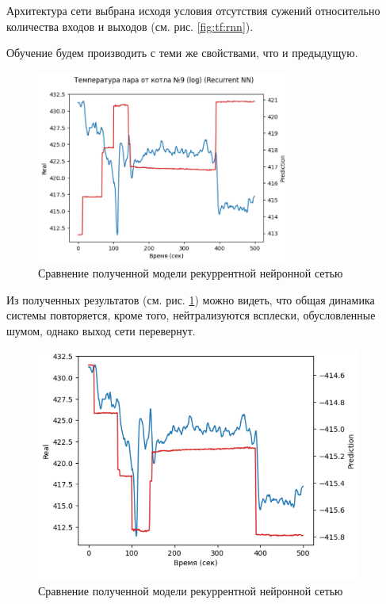 Архитектура сети выбрана исходя условия отсутствия сужений относительно
количества входов и выходов (см. рис. \ref{fig:tf:rnn}). 

Обучение будем производить с теми же свойствами, что и предыдущую. 

\begin{figure}[H]
  \begin{center}
    \includegraphics[width=0.75\textwidth]{figures/tensorflow/rnn_compare.png}
  \end{center}
  \caption{Сравнение полученной модели рекуррентной нейронной
  сетью}\label{fig:tf:cmp:rnn}
\end{figure}

Из полученных результатов (см. рис. \ref{fig:tf:cmp:rnn}) можно видеть, что
общая динамика системы повторяется, кроме того, нейтрализуются всплески,
обусловленные шумом, однако выход сети перевернут. 

\begin{figure}[H]
  \begin{center}
    \includegraphics[width=0.95\textwidth]{figures/tensorflow/rnn_compare_reversed.png}
  \end{center}
  \caption{Сравнение полученной модели рекуррентной нейронной
  сетью}\label{fig:tf:cmp:rnn:reversed}
\end{figure}

